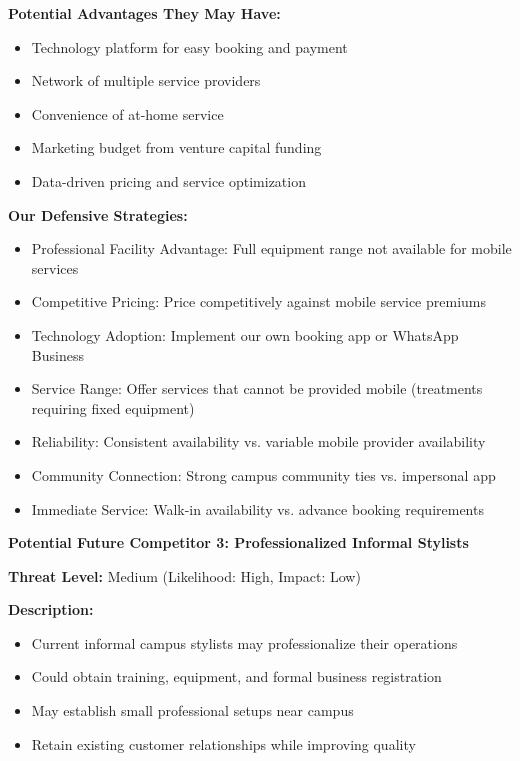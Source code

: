 \documentclass[a4paper,12pt]{article}
\begin{document}
\textbf{Potential Advantages They May Have:}
\begin{itemize}[leftmargin=2em]
    \item Technology platform for easy booking and payment
    \item Network of multiple service providers
    \item Convenience of at-home service
    \item Marketing budget from venture capital funding
    \item Data-driven pricing and service optimization
\end{itemize}

\textbf{Our Defensive Strategies:}
\begin{itemize}[leftmargin=2em]
    \item Professional Facility Advantage: Full equipment range not available for mobile services
    \item Competitive Pricing: Price competitively against mobile service premiums
    \item Technology Adoption: Implement our own booking app or WhatsApp Business
    \item Service Range: Offer services that cannot be provided mobile (treatments requiring fixed equipment)
    \item Reliability: Consistent availability vs. variable mobile provider availability
    \item Community Connection: Strong campus community ties vs. impersonal app
    \item Immediate Service: Walk-in availability vs. advance booking requirements
\end{itemize}

\vspace{1em}

\textbf{Potential Future Competitor 3: Professionalized Informal Stylists}

\textbf{Threat Level:} Medium (Likelihood: High, Impact: Low)

\textbf{Description:}
\begin{itemize}[leftmargin=2em]
    \item Current informal campus stylists may professionalize their operations
    \item Could obtain training, equipment, and formal business registration
    \item May establish small professional setups near campus
    \item Retain existing customer relationships while improving quality
\end{itemize}
\end{document}
